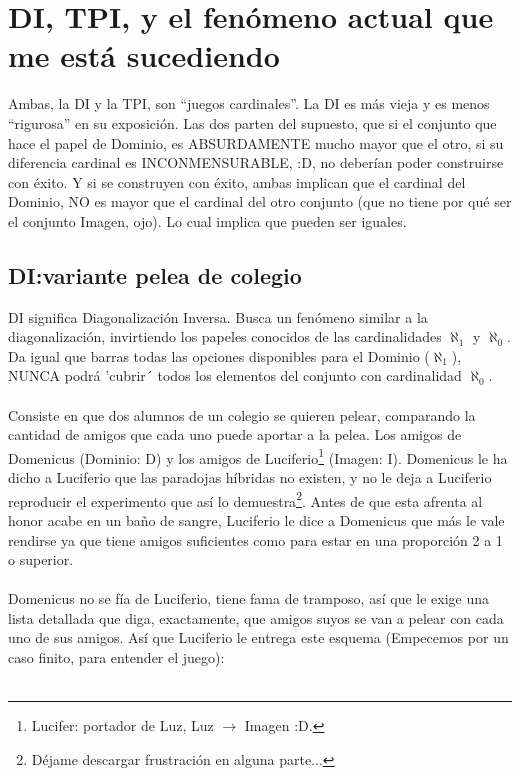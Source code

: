 \chapter{DI, TPI, y el fenómeno actual que me está sucediendo}

	\noindent
	Ambas, la DI y la TPI, son ``juegos cardinales''. La DI es más vieja y es menos ``rigurosa'' en su exposición. Las dos parten del supuesto, que si el conjunto que hace el papel de Dominio, es ABSURDAMENTE mucho mayor que el otro, si su diferencia cardinal es INCONMENSURABLE, :D, no deberían poder construirse con éxito. Y si se construyen con éxito, ambas implican que el cardinal del Dominio, NO es mayor que el cardinal del otro conjunto (que no tiene por qué ser el conjunto Imagen, ojo). Lo cual implica que pueden ser iguales.

	\section{DI:variante pelea de colegio}
	
	\noindent
	DI significa Diagonalización Inversa. Busca un fenómeno similar a la diagonalización, invirtiendo los papeles conocidos de las cardinalidades $\aleph_{1}$ y $\aleph_{0}$. Da igual que barras todas las opciones disponibles para el Dominio ($\aleph_{1}$), NUNCA podrá 'cubrir´ todos los elementos del conjunto con cardinalidad $\aleph_{0}$.
	\\\\
	
	\noindent
	Consiste en que dos alumnos de un colegio se quieren pelear, comparando la cantidad de amigos que cada uno puede aportar a la pelea. Los amigos de Domenicus (Dominio: D) y los amigos de Luciferio\footnote{Lucifer: portador de Luz, Luz $\rightarrow$ Imagen :D.} (Imagen: I). Domenicus le ha dicho a Luciferio que las paradojas híbridas no existen, y no le deja a Luciferio reproducir el experimento que así lo demuestra\footnote{Déjame descargar frustración en alguna parte...}. Antes de que esta afrenta al honor acabe en un baño de sangre, Luciferio le dice a Domenicus que más le vale rendirse ya que tiene amigos suficientes como para estar en una proporción 2 a 1 o superior.
	\\\\
	
	\noindent
	Domenicus no se fía de Luciferio, tiene fama de tramposo, así que le exige una lista detallada que diga, exactamente, que amigos suyos se van a pelear con cada uno de sus amigos. Así que Luciferio le entrega este esquema (Empecemos por un caso finito, para entender el juego):
	\\\\
	

